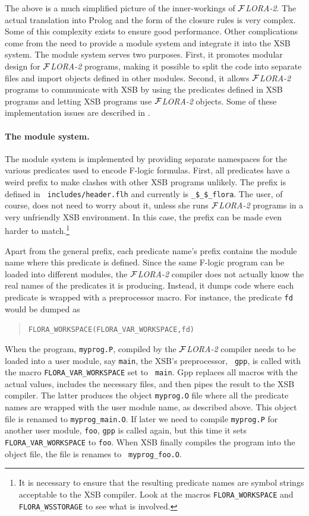 \documentclass[11pt]{article}
\newcommand{\FLORA}{{\mbox{${\cal F}${\small\it LORA}\rm\emph{-2}}}\xspace}
\newcommand{\fl}{\mbox{F-logic}\xspace}
\begin{document}
The above is a much simplified picture of the inner-workings of \FLORA. The
actual translation into Prolog and the form of the closure rules is very
complex.  Some of this complexity exists to ensure good performance.  Other
complications come from the need to provide a module system and
integrate it into the XSB system.  The module system serves two purposes.
First, it promotes modular design for \FLORA programs, making it possible
to split the code into separate files and import objects defined in other
modules. Second, it allows \FLORA programs to communicate with XSB by using
the predicates defined in XSB programs and letting XSB programs use \FLORA
objects.  Some of these implementation issues are described in
\cite{guiz-flora-00}.

\paragraph{The module system.} The module system is implemented by
providing separate namespaces for the various predicates used to encode \fl
formulas. First, all predicates have a weird prefix to make clashes with
other XSB programs unlikely. The prefix is defined in {\tt
  includes/header.flh} and currently is {\tt \_\$\_\$\_flora}. The user, of
course, does not need to worry about it, unless she runs \FLORA programs in
a very unfriendly XSB environment. In this case, the prefix can be made
even harder to match.\footnote{
  It is necessary to ensure that the resulting predicate names are symbol
  strings acceptable to the XSB compiler. Look at the macros
  {\tt FLORA\_WORKSPACE} and {\tt FLORA\_WSSTORAGE} to see what is involved.
  }

Apart from the general prefix, each predicate name's prefix contains the module
name where this predicate is defined. Since the same \fl program
can be loaded into different modules, the \FLORA compiler does not actually
know the real names of the predicates it is producing. Instead, it dumps
code where each predicate is wrapped with a preprocessor macro. For
instance, the predicate {\tt fd} would be dumped as
\begin{quote}
 \tt FLORA\_WORKSPACE(FLORA\_VAR\_WORKSPACE,fd)  
\end{quote}
When the program, {\tt myprog.P}, compiled by the \FLORA compiler needs to
be loaded into a user module, say {\tt main}, the XSB's preprocessor, {\tt
  gpp}, is called with the macro {\tt FLORA\_VAR\_WORKSPACE} set to {\tt
  main}. Gpp replaces all macros with the actual values, includes the
necessary files, and then pipes the result to the XSB compiler. The latter
produces the object {\tt myprog.O} file where all the predicate names are
wrapped with the user module name, as described above.  This object file is
renamed to {\tt myprog\_main.O}. If later we need to compile {\tt myprog.P}
for another user module, {\tt foo}, {\tt gpp} is called again, but this time it
sets {\tt FLORA\_VAR\_WORKSPACE} to {\tt foo}. When XSB finally compiles
the program into the object file, the file is renames to {\tt
  myprog\_foo.O}.
\end{document}
